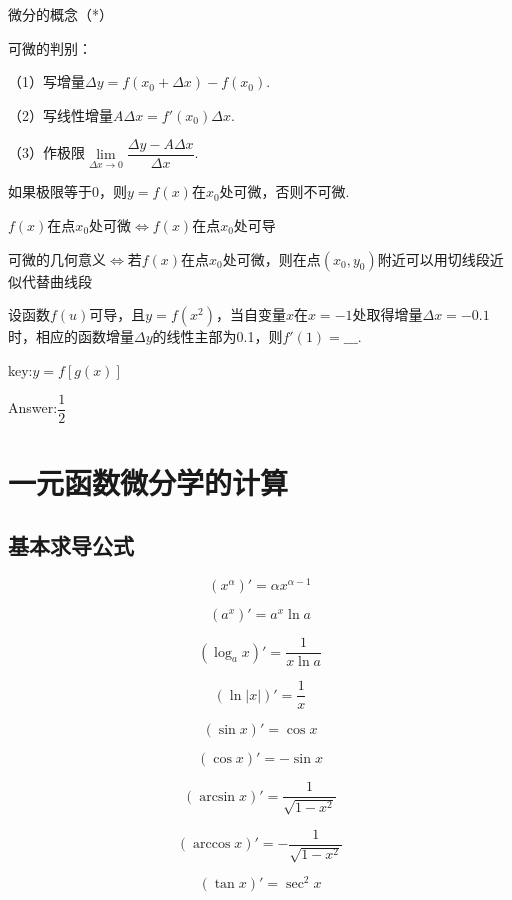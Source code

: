 \documentclass[12pt, a4paper, oneside]{ctexbook}
\begin{document}
微分的概念（*）

\hspace*{\fill}

可微的判别：

（1）写增量$\Delta y=f(x_0+\Delta x)-f(x_0)$.

（2）写线性增量$A\Delta x=f'(x_0)\Delta x$.

（3）作极限$\lim\limits_{\Delta x \to 0}\dfrac{\Delta y-A\Delta x}{\Delta x}$.

如果极限等于0，则$y=f(x)$在$x_0$处可微，否则不可微.

\hspace*{\fill}

$f(x)$在点$x_0$处可微$\iff$$f(x)$在点$x_0$处可导

\hspace*{\fill}

可微的几何意义$\iff$若$f(x)$在点$x_0$处可微，则在点$(x_0,y_0)$附近可以用切线段近似代替曲线段

\hspace*{\fill}

设函数$f(u)$可导，且$y=f(x^2)$，当自变量$x$在$x=-1$处取得增量$\Delta x= -0.1$时，相应的函数增量$\Delta y$的线性主部为0.1，则$f'(1)=\_\_\_.$

key:$y=f[g(x)]$

Answer:$\dfrac{1}{2}$

\hspace*{\fill}



\chapter{一元函数微分学的计算}

\section{基本求导公式}

\[(x^{\alpha})'=\alpha x^{\alpha -1}\]

\[(a^x)'=a^x\ln a\]

\[(\log_a x)'=\dfrac{1}{x\ln a}\]

\[(\ln |x|)'=\dfrac{1}{x}\]

\[(\sin x)'=\cos x\]

\[(\cos x)'=-\sin x\]

\[(\arcsin x)'=\dfrac{1}{\sqrt{1-x^2}}\]

\[(\arccos x)'=-\dfrac{1}{\sqrt{1-x^2}}\]

\[(\tan x)'=\sec ^2 x\]
\end{document}
